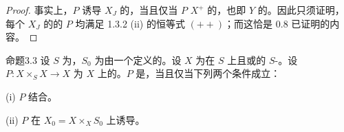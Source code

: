 \begin{proof}
事实上，$P$ 诱导 $X_J$ 的，当且仅当 $P$  $X^+$ 的，也即 $Y$ 的。因此只须证明，每个 $X_J$ 的的 $P$ 均满足 1.3.2 (ii) 的恒等式 $(++)$；而这恰是 0.8 已证明的内容。
\end{proof}
\begin{SGAresult}{命题}{3.3}
设 $S$ 为，$S_0$ 为由一个定义的。设 $X$ 为在 $S$ 上且或的 $S$-。设 $P:X\times_S X\to X$ 为 $X$ 上的。$P$ 是，当且仅当下列两个条件成立：

(i) $P$ 结合。

(ii) $P$ 在 $X_0=X\times_X S_0$ 上诱导。
\end{SGAresult}
